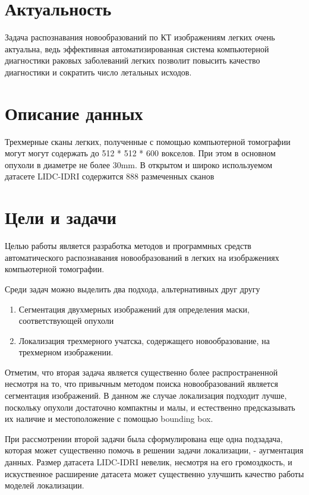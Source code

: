 
\section{Актуальность}

Задача распознавания новообразований по КТ изображениям легких очень актуальна, ведь эффективная автоматизированная система компьютерной диагностики раковых заболеваний легких позволит повысить качество диагностики и сократить число летальных исходов.

\section{Описание данных}

Трехмерные сканы легких, полученные с помощью компьютерной томографии могут могут содержать до 512 * 512 * 600 вокселов. При этом в основном опухоли в диаметре не более 30mm. В открытом и широко используемом датасете LIDC-IDRI содержится 888 размеченных сканов

\section{Цели и задачи}

Целью работы является разработка методов и программных средств автоматического распознавания новообразований в легких на изображениях компьютерной томографии. 

Среди задач можно выделить два подхода, альтернативных друг другу

\begin{enumerate}
    \item Сегментация двухмерных изображений для определения маски, соответствующей опухоли
    \item Локализация трехмерного учатска, содержащего новообразование, на трехмерном изображении.
\end{enumerate}

Отметим, что вторая задача является существенно более распространенной несмотря на то, что
привычным методом поиска новообразований является сегментация изображений. В данном же случае локализация подходит лучше, поскольку опухоли достаточно компактны и малы, и естественно предсказывать их наличие и местоположение с помощью bounding box.

При рассмотрении второй задачи была сформулирована еще одна подзадача, которая может существенно помочь в решении задачи локализации, - аугментация данных. Размер датасета LIDC-IDRI невелик, несмотря на его громоздкость, и искуственное расширение датасета может существенно улучшить качество работы моделей локализации.

